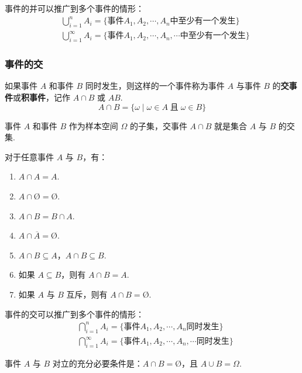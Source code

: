 事件的并可以推广到多个事件的情形：
$$
\begin{aligned}
    & \bigcup_{i=1}^n A_i = \{ \text{事件} A_1,A_2,\cdots,A_n \text{中至少有一个发生} \} \\
    & \bigcup_{i=1}^\infty A_i = \{ \text{事件} A_1,A_2,\cdots,A_n,\cdots \text{中至少有一个发生} \}
\end{aligned}
$$

\subsubsection{事件的交}

如果事件 $A$ 和事件 $B$ 同时发生，则这样的一个事件称为事件 $A$ 与事件 $B$ 的\textbf{交事件}或\textbf{积事件}，记作 $A \cap B$ 或 $AB$.
$$
A \cap B = \{ \omega \mid \omega \in A \;\text{且}\; \omega \in B \}
$$

事件 $A$ 和事件 $B$ 作为样本空间 $\varOmega$ 的子集，交事件 $A \cap B$ 就是集合 $A$ 与 $B$ 的交集.

\begin{property}
    \indent 对于任意事件 $A$ 与 $B$，有：
    \begin{enumerate}
        \item $A \cap A = A$.
        \item $A \cap \text{\O} = \text{\O}$.
        \item $A \cap B = B \cap A$.
        \item $A \cap \overline{A} = \text{\O}$.
        \item $A \cap B \subseteq A$，$A \cap B \subseteq B$.
        \item 如果 $A \subseteq B$，则有 $A \cap B = A$.
        \item 如果 $A$ 与 $B$ 互斥，则有 $A \cap B = \text{\O}$.
    \end{enumerate}
\end{property}

事件的交可以推广到多个事件的情形：
$$
\begin{aligned}
    & \bigcap_{i=1}^n A_i = \{ \text{事件} A_1,A_2,\cdots,A_n \text{同时发生} \} \\
    & \bigcap_{i=1}^\infty A_i = \{ \text{事件} A_1,A_2,\cdots,A_n,\cdots \text{同时发生} \}
\end{aligned}
$$

\begin{conclusion}
    \indent 事件 $A$ 与 $B$ 对立的充分必要条件是：$A \cap B = \text{\O}$，且 $A \cup B = \varOmega$.
\end{conclusion}

